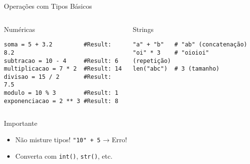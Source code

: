 \begin{frame}[fragile]{Operações com Tipos Básicos}
\begin{columns}[T]

\begin{block}{Numéricas}
\begin{verbatim}
soma = 5 + 3.2         #Result: 8.2
subtracao = 10 - 4     #Result: 6
multiplicacao = 7 * 2  #Result: 14
divisao = 15 / 2       #Result: 7.5
modulo = 10 % 3        #Result: 1
exponenciacao = 2 ** 3 #Result: 8
\end{verbatim}
\end{block}

\begin{block}{Strings}
\begin{verbatim}
"a" + "b"   # "ab" (concatenação)
"oi" * 3    # "oioioi" (repetição)
len("abc")  # 3 (tamanho)
\end{verbatim}
\end{block}

\end{columns}

\begin{exampleblock}{Importante}
\begin{itemize}
    \item Não misture tipos! \texttt{"10" + 5} → Erro!
    \item Converta com \texttt{int()}, \texttt{str()}, etc.
\end{itemize}
\end{exampleblock}
\end{frame}

